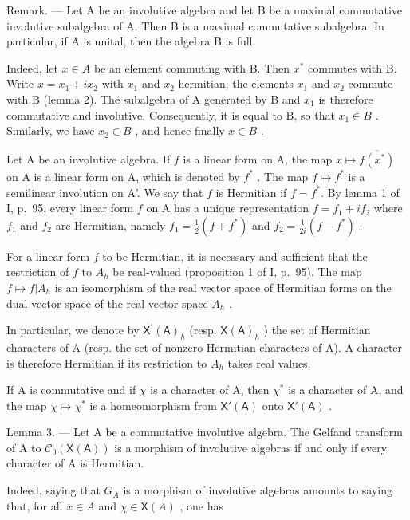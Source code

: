Remark. — Let A be an involutive algebra and let B be a maximal commutative involutive subalgebra of A. Then B is a maximal commutative subalgebra. In particular, if A is unital, then the algebra B is full.

Indeed, let \(x \in A\) be an element commuting with B. Then \(x^{*}\) commutes with B. Write \(x = x_{1} + ix_{2}\) with \(x_{1}\) and \(x_{2}\) hermitian; the elements \(x_{1}\) and \(x_{2}\) commute with B (lemma 2). The subalgebra of A generated by B and \(x_{1}\) is therefore commutative and involutive. Consequently, it is equal to B, so that \(x_{1} \in B\) . Similarly, we have \(x_{2} \in B\) , and hence finally \(x \in B\) .

Let A be an involutive algebra. If \(f\) is a linear form on A, the map \(x \mapsto \overline{f(x^*)}\) on A is a linear form on A, which is denoted by \(f^*\) . The map \(f \mapsto f^*\) is a semilinear involution on A'. We say that \(f\) is Hermitian if \(f = f^*\). By lemma 1 of I, p.~95, every linear form \(f\) on A has a unique representation \(f = f_1 + if_2\) where \(f_1\) and \(f_2\) are Hermitian, namely \(f_1 = \frac{1}{2}(f + f^*)\) and \(f_2 = \frac{1}{2i}(f - f^*)\) .

For a linear form \(f\) to be Hermitian, it is necessary and sufficient that the restriction of \(f\) to \(A_h\) be real-valued (proposition 1 of I, p.~95). The map \(f \mapsto f|A_h\) is an isomorphism of the real vector space of Hermitian forms on the dual vector space of the real vector space \(A_h\) .

In particular, we denote by \(\mathsf{X}^{\prime}(\mathsf{A})_{h}\) (resp. \(\mathsf{X}(\mathsf{A})_{h}\) ) the set of Hermitian characters of A (resp. the set of nonzero Hermitian characters of A). A character is therefore Hermitian if its restriction to \(A_{h}\) takes real values.

If A is commutative and if \(\chi\) is a character of A, then \(\chi^{*}\) is a character of A, and the map \(\chi \mapsto \chi^{*}\) is a homeomorphism from \(\mathsf{X}'(\mathsf{A})\) onto \(\mathsf{X}'(\mathsf{A})\) .

Lemma 3. --- Let A be a commutative involutive algebra. The Gelfand transform of A to \(\mathcal{C}_{0}(\mathsf{X}(\mathsf{A}))\) is a morphism of involutive algebras if and only if every character of A is Hermitian.

Indeed, saying that \(G_{A}\) is a morphism of involutive algebras amounts to saying that, for all \(x \in A\) and \(\chi \in \mathsf{X}(A)\) , one has

